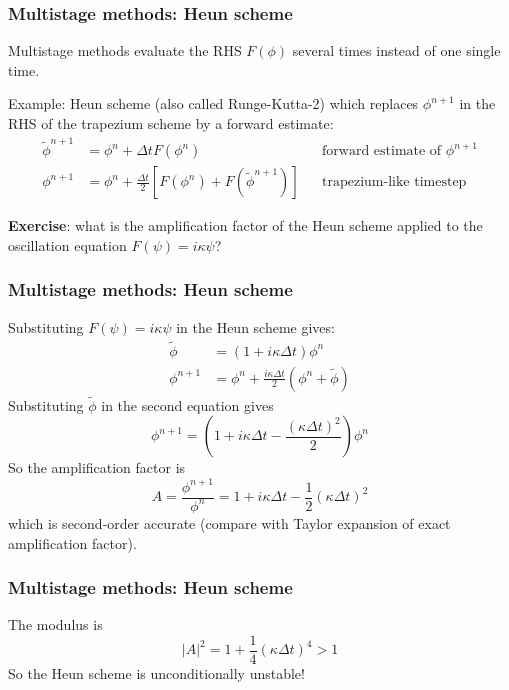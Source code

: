 \documentclass[aspectratio=43,9pt]{beamer}
\begin{document}
\begin{frame}
	\frametitle{Multistage methods: Heun scheme}
	Multistage methods evaluate the RHS $F(\phi)$ several times instead of one single time.
	\vspace*{2ex}\par
	Example: Heun scheme (also called Runge-Kutta-2) which replaces $\phi^{n+1}$ in the RHS of the trapezium scheme by a forward estimate:
	\begin{align*}
		\tilde \phi^{n+1}&=\phi^n+\Delta t F(\phi^n)	&& \text{forward estimate of }\phi^{n+1}	\\
		\phi^{n+1}&=\phi^n+\frac{\Delta t}{2}\left[ F(\phi^n)+F(\tilde \phi^{n+1})\right] &&\text{trapezium-like timestep}
	\end{align*}
\pause
	\vspace*{2ex}\par
	\textbf{Exercise}: what is the amplification factor of the Heun scheme applied to the oscillation equation $F(\psi)=i\kappa\psi$?
\end{frame}
%
%
%
\begin{frame}
	\frametitle{Multistage methods: Heun scheme}
	Substituting $F(\psi)=i\kappa\psi$ in the Heun scheme gives:
	\begin{align*}
		\tilde\phi&=(1+i\kappa\Delta t)\phi^n	\\
		\phi^{n+1} &= \phi^n + \frac{i\kappa\Delta t}{2}\left(\phi^n+\tilde \phi\right)
	\end{align*}
\pause
	Substituting $\tilde\phi$ in the second equation gives
	\begin{equation*}
		\phi^{n+1}=\left(1+i\kappa\Delta t-\frac{(\kappa\Delta t)^2}{2}\right)\phi^n
	\end{equation*}
\pause
	So the amplification factor is
	\begin{equation*}
		A = \frac{\phi^{n+1}}{\phi^n}=1 + i \kappa \Delta t - \frac{1}{2} \left( \kappa \Delta t \right)^2
	\end{equation*}
\pause
	which is second-order accurate (compare with Taylor expansion of exact amplification factor).
\end{frame}
%
%
\begin{frame}
	\frametitle{Multistage methods: Heun scheme}
	\vspace*{2ex}
	The modulus is
	\begin{equation*}
		|A|^2 = 1 + \frac{1}{4}\left(\kappa \Delta t \right)^4 > 1
	\end{equation*}
	So the Heun scheme is unconditionally unstable!
\end{frame}
\end{document}
